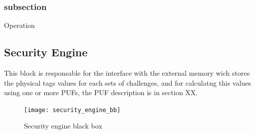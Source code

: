 \subsubsection{subsection}{Operation}














\subsection{Security Engine}

This block is responsable for the interface with the external memory wich stores the physical tags values
for each sets of challenges, and for calculatng this values using one or more PUFs, the PUF description is in section XX.


\begin{figure}[!ht]
	\centering
	\texttt{[image: security\_engine\_bb]}
    \caption{Security engine  black box  }
	\label{fig:sebb}
\end{figure}




